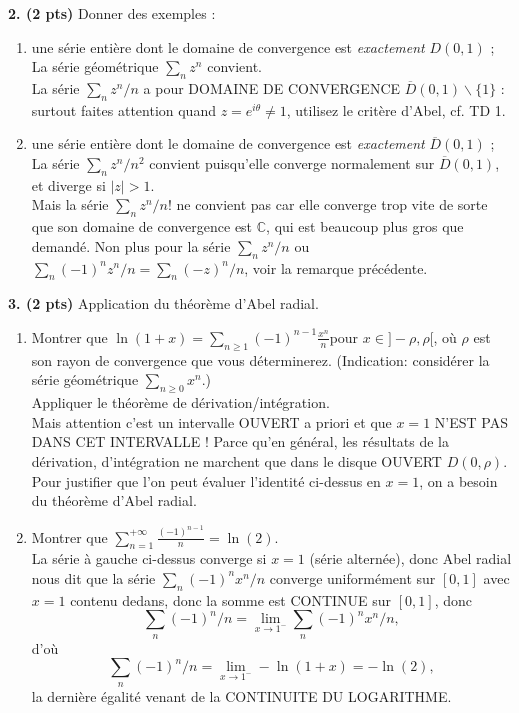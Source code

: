 \documentclass[a4paper,10pt]{article}
\newcommand{\C}{\mathbb{C}}
\newcommand{\abs}[1]{\left|#1\right|}
\newcommand{\correction}[1]{{\color{red}#1}}
\newcommand{\comment}[1]{{\color{blue}#1}}
\begin{document}
\vspace{.1in}
\noindent
\textbf{2. (2 pts)} Donner des exemples :
\begin{enumerate}[label=\alph*)]
    \item une série entière dont le domaine de convergence est \emph{exactement} $D(0,1)$ ; \\
    \correction{La série géométrique $\sum_n z^n$ convient.}\\
    \comment{La série $\sum_n z^n/n$ a pour DOMAINE DE CONVERGENCE $\overline{D}(0,1)\backslash\{1\}$ : surtout faites attention quand $z=e^{i\theta}\neq 1$, utilisez le critère d'Abel, cf. TD 1.}
    \item une série entière dont le domaine de convergence est \emph{exactement} $\overline{D}(0,1)$ ; \\
    \correction{La série $\sum_nz^n/n^2$ convient puisqu'elle converge normalement sur $\overline{D}(0,1)$, et diverge si $\abs{z}>1$.}\\
    \comment{Mais la série $\sum_nz^n/n!$ ne convient pas car elle converge trop vite de sorte que son domaine de convergence est $\C$, qui est beaucoup plus gros que demandé. Non plus pour la série $\sum_nz^n/n$ ou $\sum_n(-1)^nz^n/n=\sum_n(-z)^n/n$, voir la remarque précédente.}
\end{enumerate}

\vspace{.1in}
\noindent
\textbf{3. (2 pts)} Application du théorème d'Abel radial.
\begin{enumerate}[label=\alph*)]
    \item Montrer que $\ln(1+x) = \sum_{n\geq1} (-1)^{n-1}\frac{x^n}{n}$pour $x\in]-\rho,\rho[$, où $\rho$ est son rayon de convergence que vous déterminerez. (Indication: considérer la série géométrique $\sum_{n\geq0} x^n$.) \\
    \correction{Appliquer le théorème de dérivation/intégration.} \\
    \comment{Mais attention c'est un intervalle OUVERT a priori et que $x=1$ N'EST PAS DANS CET INTERVALLE ! Parce qu'en général, les résultats de la dérivation, d'intégration ne marchent que dans le disque OUVERT $D(0,\rho)$. Pour justifier que l'on peut évaluer l'identité ci-dessus en $x=1$, on a besoin du théorème d'Abel radial.}
    \item Montrer que $\sum_{n=1}^{+\infty} \frac{(-1)^{n-1}}{n} = \ln(2)$. \\
    \correction{La série à gauche ci-dessus converge si $x=1$ (série alternée), donc Abel radial nous dit que la série  $\sum_n(-1)^nx^n/n$ converge uniformément sur $[0,1]$ avec $x=1$ contenu dedans, donc la somme est CONTINUE sur $[0,1]$, donc
    $$\sum_n(-1)^n/n=\lim_{x\to 1^-}\sum_n(-1)^nx^n/n,$$
    d'où
    $$\sum_n(-1)^n/n=\lim_{x\to1^-}-\ln(1+x)=-\ln(2),$$
    la dernière égalité venant de la CONTINUITE DU LOGARITHME.}
\end{enumerate}
\end{document}
